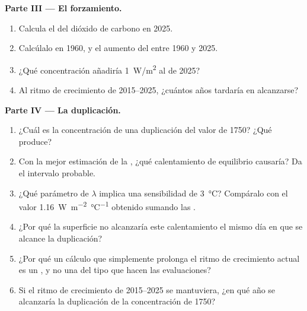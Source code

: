 \begin{problem}
\medskip
\noindent\textbf{Parte III --- El forzamiento.}
\begin{enumerate}[resume]
  \item Calcula el  del dióxido de carbono en 2025.
  \item Calcúlalo en 1960, y el aumento del  entre 1960
        y 2025.
  \item ¿Qué concentración añadiría \qty{1}{W/m^2} al  de 2025?
  \item Al ritmo de crecimiento de 2015--2025, ¿cuántos años tardaría en alcanzarse?
\end{enumerate}

\medskip
\noindent\textbf{Parte IV --- La duplicación.}
\begin{enumerate}[resume]
  \item ¿Cuál es la concentración de una duplicación del valor de 1750? ¿Qué
         produce?
  \item Con la mejor estimación de la ,
        ¿qué calentamiento de equilibrio causaría? Da el intervalo probable.
  \item ¿Qué parámetro de  $\lambda$ implica una sensibilidad de
        \qty{3}{\degreeCelsius}? Compáralo con el valor
        \qty{1.16}{W.m^{-2}.\degreeCelsius^{-1}} obtenido sumando las
        .
  \item ¿Por qué la superficie no alcanzaría este calentamiento el mismo día en que
        se alcance la duplicación?
  \item ¿Por qué un cálculo que simplemente prolonga el ritmo de crecimiento actual es un
        , y no una  del tipo que hacen las evaluaciones?
  \item Si el ritmo de crecimiento de 2015--2025 se mantuviera, ¿en qué año
        se alcanzaría la duplicación de la concentración de 1750?
\end{enumerate}
\end{problem}
